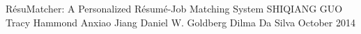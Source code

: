 \approvalfour
{R\'esuMatcher: A Personalized R\'esum\'e-Job Matching System
}
{SHIQIANG GUO}%
{Tracy Hammond
}
{Anxiao Jiang
}
{Daniel W. Goldberg
}
{Dilma Da Silva}
{October 2014}%

%
%

